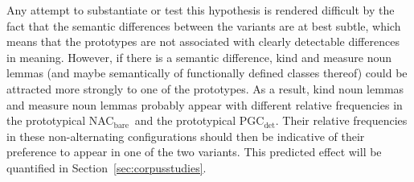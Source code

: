 \documentclass[USenglish]{article}
\newcommand{\Sub}[1]{\ensuremath{\mathrm{_{#1}}}}
\newcommand{\NACb}{NAC\Sub{bare}}
\newcommand{\PGCd}{PGC\Sub{det}}
\begin{document}
Any attempt to substantiate or test this hypothesis is rendered difficult by the fact that the semantic differences between the variants are at best subtle, which means that the prototypes are not associated with clearly detectable differences in meaning.
However, if there is a semantic difference, kind and measure noun lemmas (and maybe semantically of functionally defined classes thereof) could be attracted more strongly to one of the prototypes.
As a result, kind noun lemmas and measure noun lemmas probably appear with different relative frequencies in the prototypical \NACb\ and the prototypical \PGCd.
Their relative frequencies in these non-alternating configurations should then be indicative of their preference to appear in one of the two variants.
This predicted effect will be quantified in Section~\ref{sec:corpusstudies}.

%
\end{document}
